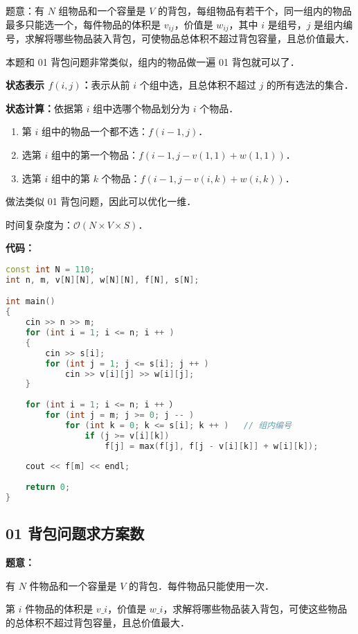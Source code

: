 题意：有 $N$ 组物品和一个容量是 $V$ 的背包，每组物品有若干个，同一组内的物品最多只能选一个，每件物品的体积是 $v_{ij}$，价值是 $w_{ij}$，其中 $i$ 是组号，$j$ 是组内编号，求解将哪些物品装入背包，可使物品总体积不超过背包容量，且总价值最大．

本题和 01 背包问题非常类似，组内的物品做一遍 01 背包就可以了．

\textbf{状态表示 $f(i, j)$：}表示从前 $i$ 个组中选，且总体积不超过 $j$ 的所有选法的集合．

\textbf{状态计算：}依据第 $i$ 组中选哪个物品划分为 $i$ 个物品．

\begin{enumerate}
\item 第 $i$ 组中的物品一个都不选：$f(i - 1, j)$．
\item 选第 $i$ 组中的第一个物品：$f(i - 1, j - v(1, 1) + w(1, 1))$．
\item 选第 $i$ 组中的第 $k$ 个物品：$f(i - 1, j - v(i, k) + w(i, k))$．
\end{enumerate}

做法类似 01 背包问题，因此可以优化一维．

时间复杂度为：$\mathcal{O}(N \times V \times S)$．

\textbf{代码：}

\begin{lstlisting}[language=cpp]
const int N = 110;
int n, m, v[N][N], w[N][N], f[N], s[N];

int main()
{
    cin >> n >> m;
    for (int i = 1; i <= n; i ++ )
    {
        cin >> s[i];
        for (int j = 1; j <= s[i]; j ++ )
            cin >> v[i][j] >> w[i][j];
    }
    
    for (int i = 1; i <= n; i ++ ）
        for (int j = m; j >= 0; j -- )
            for (int k = 0; k <= s[i]; k ++ )   // 组内编号
                if (j >= v[i][k])
                    f[j] = max(f[j], f[j - v[i][k]] + w[i][k]);
    
    cout << f[m] << endl;
    
    return 0;
}
\end{lstlisting}

\subsection{01 背包问题求方案数}

\textbf{题意：}

有 $N$ 件物品和一个容量是 $V$ 的背包．每件物品只能使用一次．

第 $i$ 件物品的体积是 $v\_i$，价值是 $w\_i$，求解将哪些物品装入背包，可使这些物品的总体积不超过背包容量，且总价值最大．

